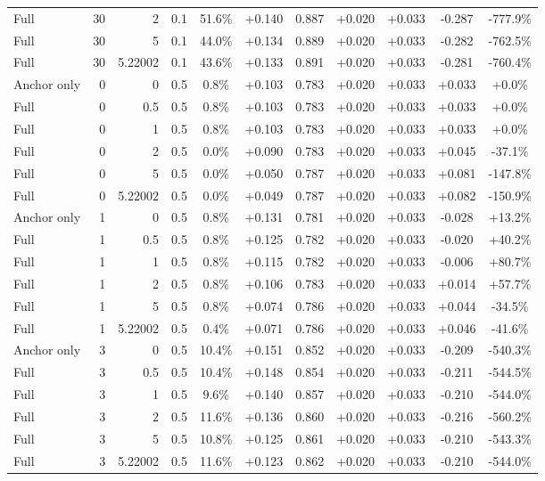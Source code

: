 \begin{table}[htbp]
\begin{tabular}{lrrrccccccc}
Full & 30 & 2 & 0.1 & 51.6\% & +0.140 & 0.887 & +0.020 & +0.033 & -0.287 & -777.9\% \\
Full & 30 & 5 & 0.1 & 44.0\% & +0.134 & 0.889 & +0.020 & +0.033 & -0.282 & -762.5\% \\
Full & 30 & 5.22002 & 0.1 & 43.6\% & +0.133 & 0.891 & +0.020 & +0.033 & -0.281 & -760.4\% \\
Anchor only & 0 & 0 & 0.5 & 0.8\% & +0.103 & 0.783 & +0.020 & +0.033 & +0.033 & +0.0\% \\
Full & 0 & 0.5 & 0.5 & 0.8\% & +0.103 & 0.783 & +0.020 & +0.033 & +0.033 & +0.0\% \\
Full & 0 & 1 & 0.5 & 0.8\% & +0.103 & 0.783 & +0.020 & +0.033 & +0.033 & +0.0\% \\
Full & 0 & 2 & 0.5 & 0.0\% & +0.090 & 0.783 & +0.020 & +0.033 & +0.045 & -37.1\% \\
Full & 0 & 5 & 0.5 & 0.0\% & +0.050 & 0.787 & +0.020 & +0.033 & +0.081 & -147.8\% \\
Full & 0 & 5.22002 & 0.5 & 0.0\% & +0.049 & 0.787 & +0.020 & +0.033 & +0.082 & -150.9\% \\
Anchor only & 1 & 0 & 0.5 & 0.8\% & +0.131 & 0.781 & +0.020 & +0.033 & -0.028 & +13.2\% \\
Full & 1 & 0.5 & 0.5 & 0.8\% & +0.125 & 0.782 & +0.020 & +0.033 & -0.020 & +40.2\% \\
Full & 1 & 1 & 0.5 & 0.8\% & +0.115 & 0.782 & +0.020 & +0.033 & -0.006 & +80.7\% \\
Full & 1 & 2 & 0.5 & 0.8\% & +0.106 & 0.783 & +0.020 & +0.033 & +0.014 & +57.7\% \\
Full & 1 & 5 & 0.5 & 0.8\% & +0.074 & 0.786 & +0.020 & +0.033 & +0.044 & -34.5\% \\
Full & 1 & 5.22002 & 0.5 & 0.4\% & +0.071 & 0.786 & +0.020 & +0.033 & +0.046 & -41.6\% \\
Anchor only & 3 & 0 & 0.5 & 10.4\% & +0.151 & 0.852 & +0.020 & +0.033 & -0.209 & -540.3\% \\
Full & 3 & 0.5 & 0.5 & 10.4\% & +0.148 & 0.854 & +0.020 & +0.033 & -0.211 & -544.5\% \\
Full & 3 & 1 & 0.5 & 9.6\% & +0.140 & 0.857 & +0.020 & +0.033 & -0.210 & -544.0\% \\
Full & 3 & 2 & 0.5 & 11.6\% & +0.136 & 0.860 & +0.020 & +0.033 & -0.216 & -560.2\% \\
Full & 3 & 5 & 0.5 & 10.8\% & +0.125 & 0.861 & +0.020 & +0.033 & -0.210 & -543.3\% \\
Full & 3 & 5.22002 & 0.5 & 11.6\% & +0.123 & 0.862 & +0.020 & +0.033 & -0.210 & -544.0\% \\

\end{tabular}
\end{table}
